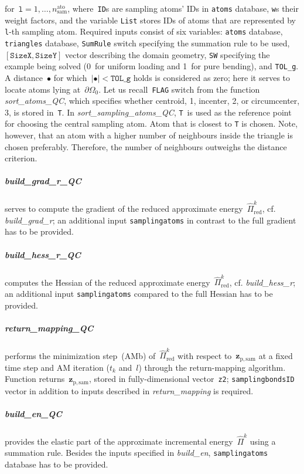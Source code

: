 \documentclass[preprint,12pt,authoryear]{elsarticle}
\newcommand{\bs}[1]{{\boldsymbol{#1}}}
\begin{document}
\noindent
for~$\texttt{l}=1,\dots,n_\mathrm{sam}^\mathrm{ato}$, where~\texttt{ID}s are sampling atoms' IDs in \texttt{atoms} database, \texttt{w}s their weight factors, and the variable \texttt{List} stores IDs of atoms that are represented by \texttt{l}-th sampling atom. Required inputs consist of six variables: \texttt{atoms} database, \texttt{triangles} database, \texttt{SumRule} switch specifying the summation rule to be used, $[\texttt{SizeX},\allowbreak \texttt{SizeY}]$ vector describing the domain geometry, \texttt{SW} specifying the example being solved (0~for uniform loading and 1~for pure bending), and \texttt{TOL\_g}. A distance~$\bullet$ for which~$|\bullet|<\texttt{TOL\_g}$ holds is considered as zero; here it serves to locate atoms lying at~$\partial\Omega_0$. Let us recall~\texttt{FLAG} switch from the function \emph{sort\_atoms\_QC}, which specifies whether centroid, 1, incenter, 2, or circumcenter, 3, is stored in~\texttt{T}. In \emph{sort\_sampling\_atoms\_QC}, \texttt{T}~is used as the reference point for choosing the central sampling atom. Atom that is closest to \texttt{T} is chosen. Note, however, that an atom with a higher number of neighbours inside the triangle is chosen preferably. Therefore, the number of neighbours outweighs the distance criterion. 
%
%
\subparagraph{build\_grad\_r\_QC} serves to compute the gradient of the reduced approximate energy~$\widehat{\Pi}^k_\mathrm{red}$, cf. \emph{build\_grad\_r}; an additional input \texttt{samplingatoms} in contrast to the full gradient has to be provided.
%
%
\subparagraph{build\_hess\_r\_QC} computes the Hessian of the reduced approximate energy~$\widehat{\Pi}^k_\mathrm{red}$, cf. \emph{build\_hess\_r}; an additional input \texttt{samplingatoms} compared to the full Hessian has to be provided.
%
%
\subparagraph{return\_mapping\_QC} performs the minimization step~(AMb) of~$\widehat{\Pi}^k_\mathrm{red}$ with respect to~$\bs{z}_{\mathrm{p},\mathrm{sam}}$ at a fixed time step and AM iteration ($t_k$ and~$l$) through the return-mapping algorithm. Function returns~$\bs{z}_{\mathrm{p},\mathrm{sam}}$, stored in fully-dimensional vector~\texttt{z2}; \texttt{samplingbondsID} vector in addition to inputs described in \emph{return\_mapping} is required.
%
%
\subparagraph{build\_en\_QC} provides the elastic part of the approximate incremental energy~$\widehat{\Pi}^k$ using a summation rule. Besides the inputs specified in \emph{build\_en}, \texttt{samplingatoms} database has to be provided.
\end{document}
